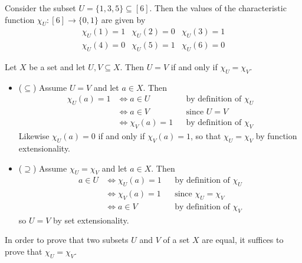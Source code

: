 \begin{example}
Consider the subset $U = \{ 1,3,5 \} \subseteq [6]$. Then the values of the characteristic function $\chi_U : [6] \to \{0,1\}$ are given by
\[ \begin{matrix} \chi_U(1) = 1 & \chi_U(2) = 0 & \chi_U(3) = 1 \\ \chi_U(4) = 0 & \chi_U(5) = 1 & \chi_U(6) = 0 \end{matrix} \]
\end{example}

\begin{theorem}
\label{thmCharacteristicFunctionsCharacteriseSubsets}
Let $X$ be a set and let $U, V \subseteq X$. Then $U=V$ if and only if $\chi_U = \chi_V$.
\end{theorem}

\begin{cproof}
\fixlistskip
\begin{itemize}
\item ($\subseteq$)
Assume $U=V$ and let $a \in X$. Then
\begin{align*}
\chi_U(a) = 1 & \Leftrightarrow a \in U && \text{by definition of $\chi_U$} \\
&\Leftrightarrow a \in V && \text{since $U=V$} \\
&\Leftrightarrow \chi_V(a) = 1 && \text{by definition of $\chi_V$}
\end{align*}
Likewise $\chi_U(a) = 0$ if and only if $\chi_V(a) = 1$, so that $\chi_U = \chi_V$ by function extensionality.

\item ($\supseteq$) Assume $\chi_U = \chi_V$ and let $a \in X$. Then
\begin{align*}
a \in U & \Leftrightarrow \chi_U(a) = 1 && \text{by definition of $\chi_U$} \\
&\Leftrightarrow \chi_V(a) = 1 && \text{since $\chi_U = \chi_V$} \\
&\Leftrightarrow a \in V && \text{by definition of $\chi_V$}
\end{align*}
so $U=V$ by set extensionality.
\end{itemize}
\end{cproof}

\begin{strategy}
\label{strSetIdentitiesFromCharacteristicFunctions}
In order to prove that two subsets $U$ and $V$ of a set $X$ are equal, it suffices to prove that $\chi_U = \chi_V$.
\end{strategy}


